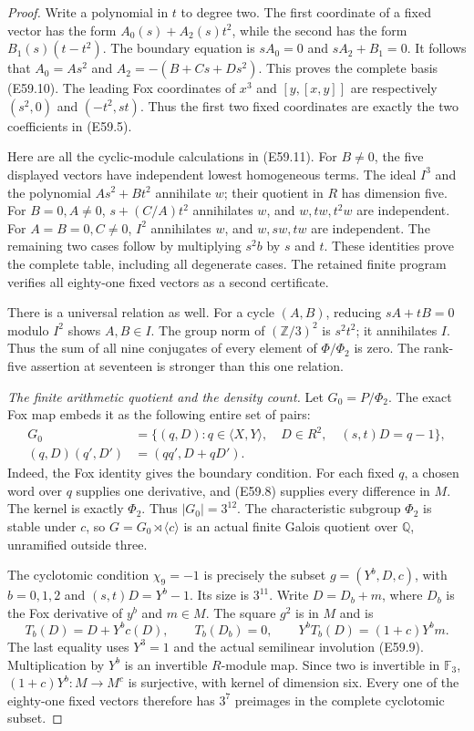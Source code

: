\begin{proof}
Write a polynomial in $t$ to degree two.
The first coordinate of a fixed vector has
the form $A_0(s)+A_2(s)t^2$, while the
second has the form $B_1(s)(t-t^2)$.
The boundary equation is
$sA_0=0$ and $sA_2+B_1=0$.
It follows that $A_0=As^2$ and
$A_2=-(B+Cs+Ds^2)$.
This proves the complete basis (E59.10).
The leading Fox coordinates of $x^3$ and
$[y,[x,y]]$ are respectively
$(s^2,0)$ and $(-t^2,st)$.
Thus the first two fixed coordinates are
exactly the two coefficients in (E59.5).

Here are all the cyclic-module calculations
in (E59.11). For $B\ne0$, the five displayed
vectors have independent lowest homogeneous
terms. The ideal $I^3$ and the polynomial
$As^2+Bt^2$ annihilate $w$; their quotient
in $R$ has dimension five. For $B=0,A\ne0$,
$s+(C/A)t^2$ annihilates $w$, and
$w,tw,t^2w$ are independent. For
$A=B=0,C\ne0$, $I^2$ annihilates $w$,
and $w,sw,tw$ are independent.
The remaining two cases follow by
multiplying $s^2b$ by $s$ and $t$.
These identities prove the complete table,
including all degenerate cases.
The retained finite program verifies
all eighty-one fixed vectors as a second
certificate.

There is a universal relation as well.
For a cycle $(A,B)$, reducing
$sA+tB=0$ modulo $I^2$ shows
$A,B\in I$. The group norm of
$(\mathbb Z/3)^2$ is $s^2t^2$; it
annihilates $I$. Thus the sum of all
nine conjugates of every element of
$\Phi/\Phi_2$ is zero.
The rank-five assertion at seventeen
is stronger than this one relation.

\emph{The finite arithmetic quotient and the density count.}
Let $G_0=P/\Phi_2$. The exact Fox map embeds
it as the following entire set of pairs:
\[
 \begin{split}
 G_0&=\{(q,D):q\in\langle X,Y\rangle,\quad
          D\in R^2,\quad(s,t)D=q-1\},\\
 (q,D)(q',D')&=(qq',D+qD').
 \end{split}
 \tag{E59.13b}
\]
Indeed, the Fox identity gives the boundary
condition. For each fixed $q$, a chosen word
over $q$ supplies one derivative, and
(E59.8) supplies every difference in $M$.
The kernel is exactly $\Phi_2$.
Thus $|G_0|=3^{12}$.
The characteristic subgroup $\Phi_2$ is
stable under $c$, so
$G=G_0\rtimes\langle c\rangle$ is an
actual finite Galois quotient over
$\mathbb Q$, unramified outside three.

The cyclotomic condition
$\chi_9=-1$ is precisely the subset
$g=(Y^b,D,c)$, with $b=0,1,2$ and
$(s,t)D=Y^b-1$. Its size is $3^{11}$.
Write $D=D_b+m$, where $D_b$ is the
Fox derivative of $y^b$ and $m\in M$.
The square $g^2$ is in $M$ and is
\[
 T_b(D)=D+Y^b c(D),\qquad
 T_b(D_b)=0,\qquad
 Y^bT_b(D)=(1+c)Y^b m .
 \tag{E59.13c}
\]
The last equality uses $Y^3=1$ and
the actual semilinear involution
(E59.9). Multiplication by $Y^b$
is an invertible $R$-module map.
Since two is invertible in $\mathbb F_3$,
$(1+c)Y^b:M\to M^c$ is surjective,
with kernel of dimension six.
Every one of the eighty-one fixed
vectors therefore has $3^7$ preimages
in the complete cyclotomic subset.


\end{proof}
